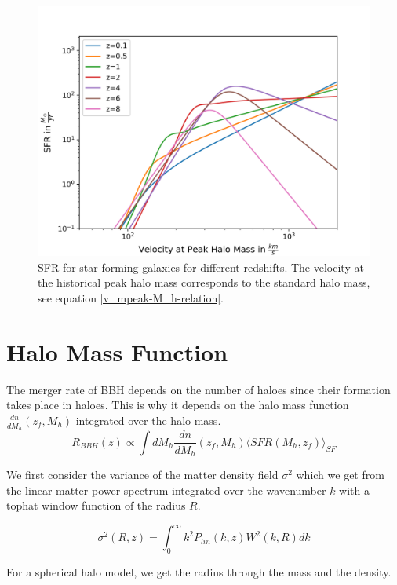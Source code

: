 \begin{figure}[h]
    \centering
    \includegraphics[width=1\linewidth]{Images/sfr_of_v.png}
    \caption{SFR for star-forming galaxies for different redshifts. The velocity at the historical peak halo mass corresponds to the standard halo mass, see equation \ref{v_mpeak-M_h-relation}.}
    \label{SFR_of_v}
\end{figure} 

\section{Halo Mass Function}

The merger rate of BBH depends on the number of haloes since their formation takes place in haloes. This is why it depends on the halo mass function $\frac{dn}{dM_h}(z_f, M_h)$ integrated over the halo mass. 
\begin{equation}
    R_{BBH}(z) \propto \int dM_h \frac{dn}{dM_h}(z_f, M_h)\langle SFR(M_h, z_f)\rangle_{SF}
\end{equation}

We first consider the variance of the matter density field $\sigma^2$ which we get from the linear matter power spectrum integrated over the wavenumber $k$ with a tophat window function of the radius $R$.

\begin{equation}
    \sigma^2(R, z) = \int_0^\infty k^2 P_{lin}(k, z) W^2(k, R) dk
\end{equation}

For a spherical halo model, we get the radius through the mass and the density.

